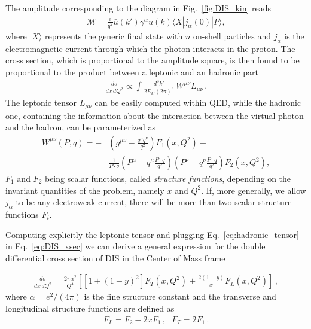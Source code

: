 %
The amplitude corresponding to the diagram in Fig.~\ref{fig:DIS_kin} reads
\begin{align}
    \label{eq:DIS_amplitude}
    \mathcal{M} = 
    \frac{e}{q^2}\bar{u}\left(k'\right)\gamma^{\alpha}u\left(k\right)\langle X | j_{\alpha}\left(0\right)|P\rangle,
\end{align}
where $|X\rangle $ represents the generic final state with $n$ on-shell particles and $j_{\alpha}$ 
is the electromagnetic current through which the photon interacts in the proton.
The cross section, which is proportional to the amplitude square, is then found to be proportional to the product between 
a leptonic and an hadronic part
\begin{align}
    \label{eq:DIS_xsec}
    \frac{d\sigma}{dx\,dQ^2} \propto \int \frac{d^3k'}{2E_{k'}\left(2\pi\right)^3}\, W^{\mu\nu}L_{\mu\nu}\,.
\end{align}
The leptonic tensor $L_{\mu\nu}$ can be easily computed within QED, while the hadronic one, containing 
the information about the interaction between the virtual photon and the hadron, can be parameterized as 
\begin{align}
    \label{eq:hadronic_tensor}
    W^{\mu\nu}\left(P,q\right) = 
    -&\left(g^{\mu\nu} -\frac{q^{\mu}q^{\nu}}{q^2}\right)F_1\left(x,Q^2\right) + \nonumber \\
    &\frac{1}{P\cdot q}\left(P^{\mu}-q^{\mu}\frac{P\cdot q}{q^2}\right)\left(P^{\nu}-q^{\nu}\frac{P\cdot q}{q^2}\right)
    F_2\left(x,Q^2\right),
\end{align}
$F_1 $ and $F_2 $ being scalar functions, called \textit{structure functions}, 
depending on the invariant quantities of the problem, namely $x$ and $Q^2$. If, more generally,
we allow $j_{\alpha}$ to be any electroweak current, there will be more than two scalar structure functions $F_i$.

%
Computing explicitly the leptonic tensor and plugging Eq.~\eqref{eq:hadronic_tensor} in Eq.~\eqref{eq:DIS_xsec} 
we can derive a general expression for the double differential cross section of DIS in the Center of Mass frame

\begin{align}
    \label{general cross xsec DIS}
    \frac{d\sigma}{dx\, dQ^2} = \frac{2\pi \alpha^2}{Q^4}\left[\left[1+\left(1-y\right)^2\right]F_T\left(x,Q^2\right) 
    +\frac{2\left(1-y\right)}{x}F_L\left(x,Q^2\right)\right]\,,
\end{align}
where $\alpha = e^2/\left(4\pi\right)$ is the fine structure constant and the transverse and longitudinal structure functions 
are defined as
\begin{align}
    F_L = F_2 -2xF_1\,, \,\,\,\, F_T = 2F_1\,.
\end{align}

